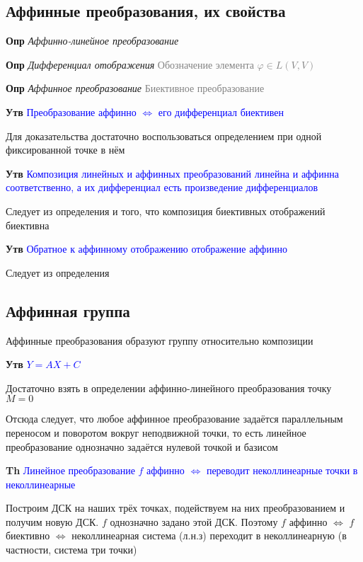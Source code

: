 \documentclass[a4paper, 14pt]{article}
\begin{document}
    \subsection{Аффинные преобразования, их свойства}

    \textbf{Опр} \textit{Аффинно-линейное преобразование}

    \textbf{Опр} \textit{Дифференциал отображения} \textcolor{gray}{Обозначение элемента $\varphi \in L(V, V)$}

    \textbf{Опр} \textit{Аффинное преобразование} \textcolor{gray}{Биективное преобразование}

    \textbf{Утв} \textcolor{blue}{Преобразование аффинно $\Leftrightarrow$ его дифференциал биективен}

    Для доказательства достаточно воспользоваться определением при одной фиксированной точке в нём

    \textbf{Утв} \textcolor{blue}{Композиция линейных и аффинных преобразований линейна и аффинна соответственно, а
    их дифференциал есть произведение дифференциалов}

    Следует из определения и того, что композиция биективных отображений биективна

    \textbf{Утв} \textcolor{blue}{Обратное к аффинному отображению отображение аффинно}

    Следует из определения

    \subsection{Аффинная группа}

    Аффинные преобразования образуют группу относительно композиции

    \textbf{Утв} \textcolor{blue}{$Y = AX + C$}

    Достаточно взять в определении аффинно-линейного преобразования точку $M = 0$

    Отсюда следует, что любое аффинное преобразование задаётся параллельным переносом и поворотом вокруг неподвижной
    точки, то есть линейное преобразование однозначно задаётся нулевой точкой и базисом

    \textbf{Th} \textcolor{blue}{Линейное преобразование $f$ аффинно $\Leftrightarrow$ переводит неколлинеарные
    точки в неколлинеарные}

    Построим ДСК на наших трёх точках, подействуем на них преобразованием и получим новую ДСК. $f$ однозначно задано
    этой ДСК.
    Поэтому $f$ аффинно $\Leftrightarrow$ $f$ биективно $\Leftrightarrow$ неколлинеарная система (л.н.з)
    переходит в неколлинеарную (в частности, система три точки)
\end{document}
